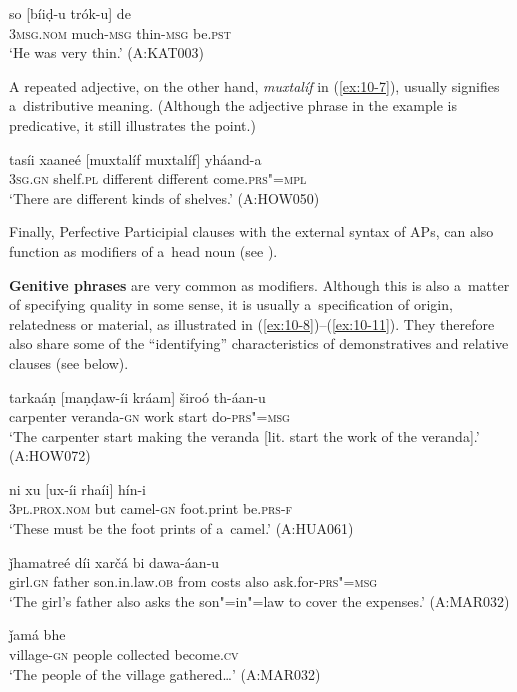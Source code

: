 \begin{exe}
\ex
\label{ex:10-6}
\gll so [bíiḍ-u trók-u] de \\
\textsc{3msg.nom} much-\textsc{msg} thin-\textsc{msg} be.\textsc{pst} \\
\glt `He was very thin.' (A:KAT003)
\end{exe}

A repeated adjective, on the other hand, \textit{muxtalíf} in (\ref{ex:10-7}), usually signifies a~distributive meaning. (Although the adjective phrase in the example is predicative, it still illustrates the point.)

\begin{exe}
\ex
\label{ex:10-7}
\gll tasíi xaaneé [muxtalíf muxtalíf] yháand-a \\
\textsc{3sg.gn} shelf.\textsc{pl} different different come.\textsc{prs"=mpl} \\
\glt `There are different kinds of shelves.' (A:HOW050)
\end{exe}

Finally, Perfective Participial clauses with the external syntax of APs, can also function as modifiers of a~head noun (see ). 


\textbf{Genitive phrases} are very common as modifiers. Although this is also a~matter of specifying quality in some
sense, it is usually a~specification of origin, relatedness or material, as illustrated in
(\ref{ex:10-8})--(\ref{ex:10-11}). They therefore
also share some of the ``identifying'' characteristics of demonstratives and relative clauses (see
below).

\begin{exe}
\ex
\label{ex:10-8}
\gll tarkaáṇ [maṇḍaw-íi kráam] široó th-áan-u  \\
carpenter veranda-\textsc{gn} work start do-\textsc{prs"=msg} \\
\glt `The carpenter start making the veranda [lit. start the work of the veranda].' (A:HOW072)

\ex
\label{ex:10-9}
\gll ni xu [ux-íi rhaíi] hín-i \\
\textsc{3pl.prox.nom} but camel-\textsc{gn} foot.print be.\textsc{prs-f}  \\
\glt `These must be the foot prints of a~camel.' (A:HUA061)

\ex
\label{ex:10-10}
 ǰhamatreé díi xarčá bi dawa-áan-u \\
girl.\textsc{gn} father son.in.law.\textsc{ob} from costs also ask.for-\textsc{prs"=msg} \\
\glt `The girl's father also asks the son"=in"=law to cover the expenses.' (A:MAR032)

\ex
\label{ex:10-11}
\gll [díiš-e xálak] ǰamá bhe \\
village-\textsc{gn} people collected become.\textsc{cv} \\
\glt `The people of the village gathered{\ldots}' (A:MAR032)
\end{exe}

